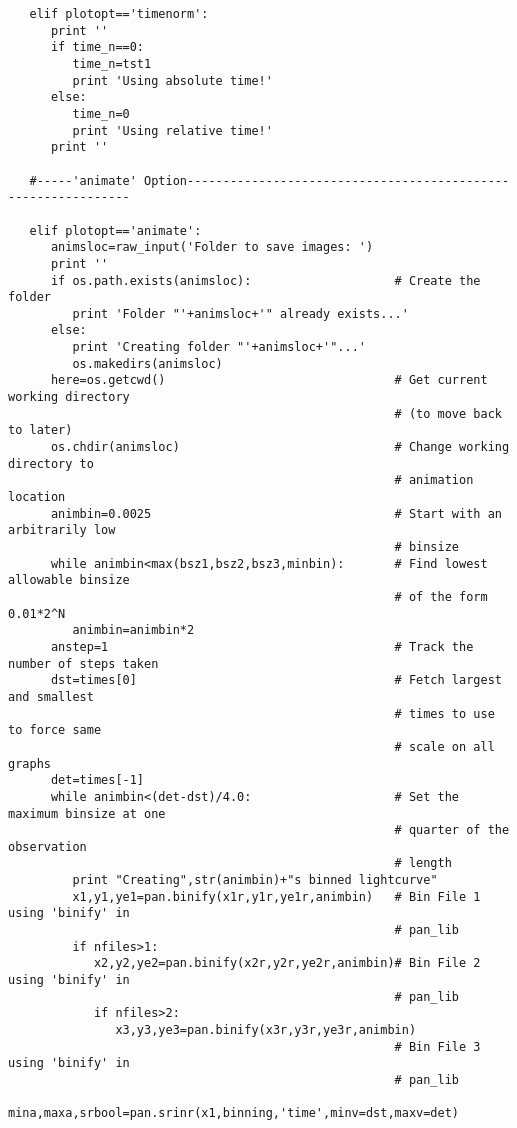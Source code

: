 \begin{verbatim}
   elif plotopt=='timenorm':
      print ''
      if time_n==0:
         time_n=tst1
         print 'Using absolute time!'
      else:
         time_n=0
         print 'Using relative time!'
      print ''

   #-----'animate' Option--------------------------------------------------------------

   elif plotopt=='animate':
      animsloc=raw_input('Folder to save images: ')
      print ''
      if os.path.exists(animsloc):                    # Create the folder
         print 'Folder "'+animsloc+'" already exists...'
      else:
         print 'Creating folder "'+animsloc+'"...'
         os.makedirs(animsloc)
      here=os.getcwd()                                # Get current working directory
                                                      # (to move back to later)
      os.chdir(animsloc)                              # Change working directory to
                                                      # animation location
      animbin=0.0025                                  # Start with an arbitrarily low
                                                      # binsize
      while animbin<max(bsz1,bsz2,bsz3,minbin):       # Find lowest allowable binsize
                                                      # of the form 0.01*2^N
         animbin=animbin*2
      anstep=1                                        # Track the number of steps taken
      dst=times[0]                                    # Fetch largest and smallest
                                                      # times to use to force same
                                                      # scale on all graphs
      det=times[-1]
      while animbin<(det-dst)/4.0:                    # Set the maximum binsize at one
                                                      # quarter of the observation
                                                      # length
         print "Creating",str(animbin)+"s binned lightcurve"
         x1,y1,ye1=pan.binify(x1r,y1r,ye1r,animbin)   # Bin File 1 using 'binify' in
                                                      # pan_lib
         if nfiles>1:
            x2,y2,ye2=pan.binify(x2r,y2r,ye2r,animbin)# Bin File 2 using 'binify' in
                                                      # pan_lib
            if nfiles>2:
               x3,y3,ye3=pan.binify(x3r,y3r,ye3r,animbin)
                                                      # Bin File 3 using 'binify' in
                                                      # pan_lib
         mina,maxa,srbool=pan.srinr(x1,binning,'time',minv=dst,maxv=det)

\end{verbatim}
